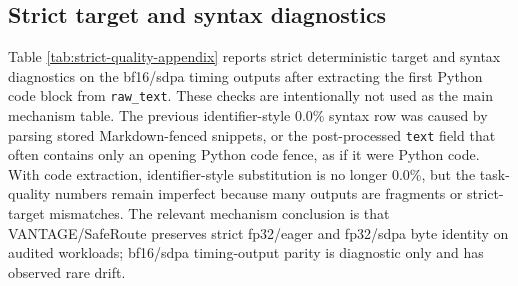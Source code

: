 \documentclass[11pt,a4paper]{article}
\begin{document}
\begin{table}[h]
\centering\scriptsize
\caption{Additional throughput diagnostics for the Qwen-base $n=100$ bf16/sdpa
timing-diagnostic validation runs. These columns are generated by
\texttt{scripts/make\_transpld\_validation\_tables.py} and are kept out
of the main table for readability.}
\label{tab:throughput-diagnostics-appendix}
\end{table}

\subsection{Strict target and syntax diagnostics}
\label{app:strict-quality}

Table \ref{tab:strict-quality-appendix} reports strict deterministic target and
syntax diagnostics on the bf16/sdpa timing outputs after extracting the first
Python code block from \texttt{raw\_text}. These checks are intentionally not
used as the main mechanism table. The previous identifier-style 0.0\% syntax row
was caused by parsing stored Markdown-fenced snippets, or the post-processed
\texttt{text} field that often contains only an opening Python code fence, as
if it were Python code. With code extraction, identifier-style substitution is no longer 0.0\%, but the
task-quality numbers remain imperfect because many outputs are fragments or
strict-target mismatches. The relevant mechanism conclusion is that
VANTAGE/SafeRoute preserves strict fp32/eager and fp32/sdpa byte identity on
audited workloads; bf16/sdpa
timing-output parity is diagnostic only and has observed rare drift.
\end{document}
